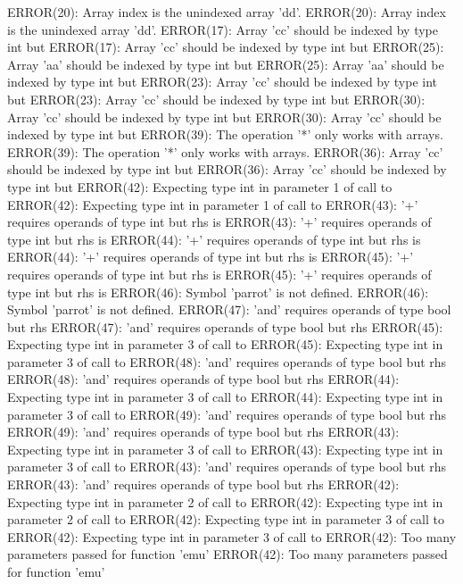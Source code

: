 \documentclass[12pt]{book}
\begin{document}
ERROR(20): Array index is the unindexed array 'dd'.                ERROR(20): Array index is the unindexed array 'dd'.
ERROR(17): Array 'cc' should be indexed by type int but         ERROR(17): Array 'cc' should be indexed by type int but 
ERROR(25): Array 'aa' should be indexed by type int but         ERROR(25): Array 'aa' should be indexed by type int but 
ERROR(23): Array 'cc' should be indexed by type int but         ERROR(23): Array 'cc' should be indexed by type int but 
ERROR(30): Array 'cc' should be indexed by type int but         ERROR(30): Array 'cc' should be indexed by type int but 
ERROR(39): The operation '*' only works with arrays.                ERROR(39): The operation '*' only works with arrays.
ERROR(36): Array 'cc' should be indexed by type int but         ERROR(36): Array 'cc' should be indexed by type int but 
ERROR(42): Expecting type int in parameter 1 of call to         ERROR(42): Expecting type int in parameter 1 of call to 
ERROR(43): '+' requires operands of type int but rhs is         ERROR(43): '+' requires operands of type int but rhs is 
ERROR(44): '+' requires operands of type int but rhs is         ERROR(44): '+' requires operands of type int but rhs is 
ERROR(45): '+' requires operands of type int but rhs is         ERROR(45): '+' requires operands of type int but rhs is 
ERROR(46): Symbol 'parrot' is not defined.                        ERROR(46): Symbol 'parrot' is not defined.
ERROR(47): 'and' requires operands of type bool but rhs         ERROR(47): 'and' requires operands of type bool but rhs 
ERROR(45): Expecting type int in parameter 3 of call to         ERROR(45): Expecting type int in parameter 3 of call to 
ERROR(48): 'and' requires operands of type bool but rhs         ERROR(48): 'and' requires operands of type bool but rhs 
ERROR(44): Expecting type int in parameter 3 of call to         ERROR(44): Expecting type int in parameter 3 of call to 
ERROR(49): 'and' requires operands of type bool but rhs         ERROR(49): 'and' requires operands of type bool but rhs 
ERROR(43): Expecting type int in parameter 3 of call to         ERROR(43): Expecting type int in parameter 3 of call to 
ERROR(43): 'and' requires operands of type bool but rhs         ERROR(43): 'and' requires operands of type bool but rhs 
ERROR(42): Expecting type int in parameter 2 of call to         ERROR(42): Expecting type int in parameter 2 of call to 
ERROR(42): Expecting type int in parameter 3 of call to         ERROR(42): Expecting type int in parameter 3 of call to 
ERROR(42): Too many parameters passed for function 'emu'        ERROR(42): Too many parameters passed for function 'emu'
\end{document}
